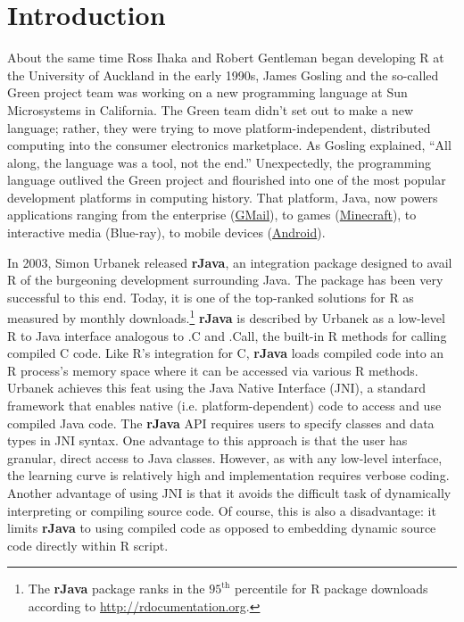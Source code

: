
\chapter{Introduction}

About the same time Ross Ihaka and Robert Gentleman began developing R at the University of Auckland in the early 1990s, James Gosling and the so-called Green project team was working on a new programming language at Sun Microsystems in California. The Green team didn't set out to make a new language; rather, they were trying to move platform-independent, distributed computing into the consumer electronics marketplace. As Gosling explained, ``All along, the language was a tool, not the end.'' Unexpectedly, the programming language outlived the Green project and flourished into one of the most popular development platforms in computing history. That platform, Java, now powers applications ranging from the enterprise (\href{https://www.google.com/gmail/about/}{GMail}), to games (\href{https://minecraft.net}{Minecraft}), to interactive media (Blue-ray), to mobile devices (\href{https://www.android.com/}{Android}).

In 2003, Simon Urbanek released \textbf{rJava}, an integration package designed to avail R of the burgeoning development surrounding Java. The package has been very successful to this end. Today, it is one of the top-ranked solutions for R as measured by monthly downloads.\footnote{The \textbf{rJava} package ranks in the $95^{\text{th}}$ percentile for R package downloads according to \href{http://rdocumentation.org}{http://rdocumentation.org}.} \textbf{rJava} is described by Urbanek as a low-level R to Java interface analogous to .C and .Call, the built-in R methods for calling compiled C code. Like R's integration for C, \textbf{rJava} loads compiled code into an R process's memory space where it can be accessed via various R methods. Urbanek achieves this feat using the Java Native Interface (JNI), a standard framework that enables native (i.e. platform-dependent) code to access and use compiled Java code. The \textbf{rJava} API requires users to specify classes and data types in JNI syntax. One advantage to this approach is that the user has granular, direct access to Java classes. However, as with any low-level interface, the learning curve is relatively high and implementation requires verbose coding. Another advantage of using JNI is that it avoids the difficult task of dynamically interpreting or compiling source code. Of course, this is also a disadvantage: it limits \textbf{rJava} to using compiled code as opposed to embedding dynamic source code directly within R script.

